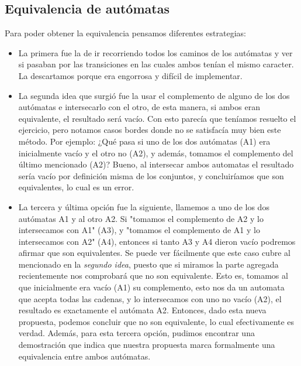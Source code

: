 \subsection{Equivalencia de autómatas}
Para poder obtener la equivalencia pensamos diferentes estrategias:
\begin{itemize}
\item La primera fue la de ir recorriendo todos los caminos de los autómatas y ver si pasaban por las transiciones en las cuales ambos tenían el mismo caracter. La descartamos porque era engorrosa y difícil de implementar.
\item La segunda idea que surgió fue la usar el complemento de alguno de los dos autómatas e intersecarlo con el otro, de esta manera, si ambos eran equivalente, el resultado será vacío. Con esto parecía que teníamos resuelto el ejercicio, pero notamos casos bordes donde no se satisfacía muy bien este método. Por ejemplo: ¿Qué pasa si uno de los dos autómatas (A1) era inicialmente vacío y el otro no (A2), y además, tomamos el complemento del último mencionado (A2)? Bueno, al intersecar ambos automatas el resultado sería vacío por definición misma de los conjuntos, y concluiríamos que son equivalentes, lo cual es un error.
\item La tercera y última opción fue la siguiente, llamemos a uno de los dos autómatas A1 y al otro A2. Si "tomamos el complemento de A2 y lo intersecamos con A1" (A3), y "tomamos el complemento de A1 y lo intersecamos con A2" (A4), entonces si tanto A3 y A4 dieron vacío podremos afirmar que son equivalentes. Se puede ver fácilmente que este caso cubre al mencionado en la \emph{segundo idea}, puesto que si miramos la parte agregada recientemente nos comprobará que no son equivalente. Esto es, tomamos al que inicialmente era vacío (A1) su complemento, esto nos da un automata que acepta todas las cadenas, y lo intersecamos con uno no vacío (A2), el resultado es exactamente el autómata A2. Entonces, dado esta nueva propuesta, podemos concluir que no son equivalente, lo cual efectivamente es verdad. Además, para esta tercera opción, pudimos encontrar una demostración que indica que nuestra propuesta marca formalmente una equivalencia entre ambos autómatas.
\end{itemize}



 


